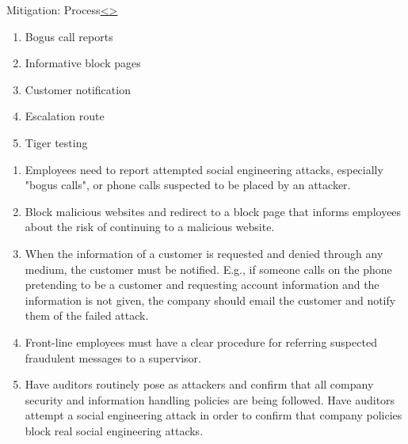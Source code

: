 \documentclass[12pt]{extarticle}
\newenvironment{instructionblock}{\Large\bgroup}{\egroup}
\begin{document}
\pagebreak
\begin{slide}{Mitigation: Process}{\hyperref[slide 19]{\textless}\hyperref[slide 21]{\textgreater}}
\vskip 5pt
\begin{instructionblock}
	\begin{enumerate}

	\item Bogus call reports
	\item Informative block pages
	\item Customer notification
	\item Escalation route
	\item Tiger testing

	\end{enumerate}
\end{instructionblock}
\end{slide}
 \begin{enumerate}
 	\item  Employees need to report attempted social engineering attacks, especially "bogus calls", or phone calls suspected to be placed by an attacker.\cite{b2}
 	\item  Block malicious websites and redirect to a block page that informs employees about the risk of continuing to a malicious website.\cite{b2}
 	\item When the information of a customer is requested and denied through any medium, the customer must be notified. E.g., if someone calls on the phone pretending to be a customer and requesting account information and the information is not given, the company should email the customer and notify them of the failed attack.\cite{b2}
 	\item Front-line employees must have a clear procedure for referring suspected fraudulent messages to a supervisor.\cite{b2}
 	\item Have auditors routinely pose as attackers and confirm that all company security and information handling policies are being followed. Have auditors attempt a social engineering attack in order to confirm that company policies block real social engineering attacks.\cite{b2}
 \end{enumerate}
\end{document}
